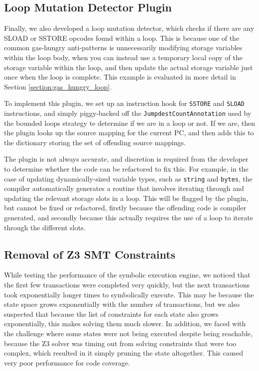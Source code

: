 \subsection{Loop Mutation Detector Plugin}

Finally, we also developed a loop mutation detector, which checks if there are any SLOAD or SSTORE
opcodes found within a loop. This is because one of the common gas-hungry anti-patterns is unnecessarily
modifying storage variables within the loop body, when you can instead use a temporary local copy of the storage 
variable within the loop, and then update the actual storage variable just once when the loop is complete. This example is evaluated
in more detail in Section \ref{section:gas_hungry_loop}. 

To implement this plugin, we set up an instruction hook for \texttt{SSTORE} and \texttt{SLOAD}
instructions, and simply piggy-backed off the \texttt{JumpdestCountAnnotation} used by
the bounded loops strategy te determine if we are in a loop or not. If we are, then the plugin looks
up the source mapping for the current PC, and then adds this to the dictionary storing the set of 
offending source mappings.

The plugin is not always accurate, and discretion is required from the developer to determine whether 
the code can be refactored to fix this. For example, in the case of updating dynamically-sized variable types,
such as \texttt{string} and \texttt{bytes}, the compiler automatically generates a routine that involves
iterating through and updating the relevant storage slots in a loop. This will be flagged by the plugin, 
but cannot be fixed or refactored, firstly because the offending code is compiler generated, and secondly 
because this actually requires the use of a loop to iterate through the different slots.

\subsection{Removal of Z3 SMT Constraints}

While testing the performance of the symbolic execution engine, we noticed that the first few transactions
were completed very quickly, but the next transactions took exponentially longer times to symbolically execute.
This may be because the state space grows exponentially with the number of transactions, but we also suspected
that because the list of constraints for each state also grows exponentially, this makes solving them much slower.
In addition, we faced with the challenge where some states were not being executed despite being reachable, 
because the Z3 solver was timing out from solving constraints that were too complex, which resulted in it simply 
pruning the state altogether. This caused very poor performance for code coverage.

